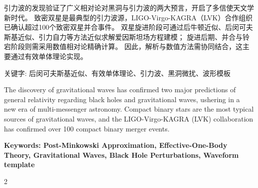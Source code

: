 \documentclass[../main.tex]{subfiles}
\begin{document}
\renewcommand{\baselinestretch}{1.5}
\pagestyle{fancy}
\fancyhead{}
\renewcommand{\headrulewidth}{1.5pt}
\renewcommand{\footrulewidth}{0pt}


\begin{cnabstract}
	{
		引力波的发现验证了广义相对论对黑洞与引力波的两大预言，开启了多信使天文学新时代。
		致密双星是最典型的引力波源，LIGO-Virgo-KAGRA（LVK）合作组织已确认超过100个致密双星并合事件。
		双星旋进阶段可通过后牛顿近似、后闵可夫斯基近似、引力自力等方法近似求解爱因斯坦场方程建模；
		旋进后期、并合与铃宕阶段则需采用数值相对论精确计算。
		因此，解析与数值方法需协同结合，这主要通过有效单体理论实现。

		\vspace{0.5cm}
		\par {\heiti {} 关键字: 后闵可夫斯基近似、有效单体理论、引力波、黑洞微扰、波形模板}
	}
\end{cnabstract}

\cleardoublepage


\begin{enabstract}
	{
		The discovery of gravitational waves has confirmed two major predictions of general relativity regarding
		black holes and gravitational waves, ushering in a new era of multi-messenger astronomy.
		Compact binary stars are the most typical sources of gravitational waves, and the LIGO-Virgo-KAGRA
		(LVK) collaboration has confirmed over 100 compact binary merger events.

		\vspace{0.5cm}
		\par {\bfseries { Keywords: Post-Minkowski Approximation, Effective-One-Body Theory,
			Gravitational Waves, Black Hole Perturbations, Waveform template}}
	}
\end{enabstract}

\cleardoublepage
\begin{spacing}{2}
	\centering{\tableofcontents}
\end{spacing}


\end{document}
